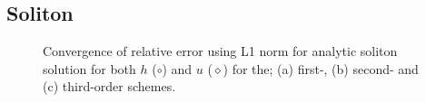 \documentclass[SingleSpace,12pt]{Serre_ASCE}
\begin{document}
\subsection{Soliton}
\label{section:Convergence Rate}
\subfiglabelskip=0pt
\begin{figure}[htb]
\centering
{}
\caption{Convergence of relative error using L1 norm for analytic soliton solution for both $h$ ($\circ$) and $u$ ($\diamond$) for the; (a) first-, (b) second- and (c) third-order schemes.}
\label{fig:solitoncon}
\end{figure}
\end{document}

